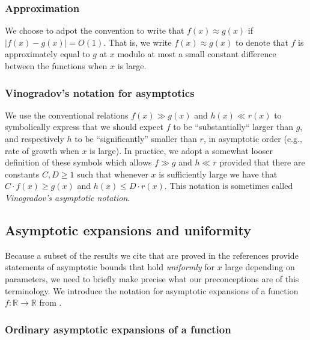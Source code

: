 \documentclass[11pt,reqno,a4letter]{article}
\numberwithin{figure}{section}
\numberwithin{table}{section}
\theoremstyle{plain}
\numberwithin{theorem}{section}
\theoremstyle{definition}
\begin{document}
\subsubsection{Approximation} 
     
We choose to adpot the convention to write that $f(x) \approx g(x)$ if $|f(x) - g(x)| = O(1)$. 
That is, we write $f(x) \approx g(x)$ to denote that $f$ is approximately equal to $g$ at $x$ modulo at most a
small constant difference between the functions when $x$ is large. 

\subsubsection{Vinogradov's notation for asymptotics} 

We use the conventional relations $f(x) \gg g(x)$ and $h(x) \ll r(x)$ to symbolically express that we should expect 
$f$ to be ``substantially`` larger than $g$, and respectively $h$ 
to be ``significantly'' smaller than $r$, in asymptotic order 
(e.g., rate of growth when $x$ is large). In practice, we adopt a somewhat looser definition of these symbols which 
allows $f \gg g$ and $h \ll r$ provided that there are constants $C, D \geq 1$ such that whenever $x$ is sufficiently 
large we have that $C \cdot f(x) \geq g(x)$ and $h(x) \leq D \cdot r(x)$. This notation is sometimes called 
\emph{Vinogradov's asymptotic notation}. 

\subsection{Asymptotic expansions and uniformity} 

Because a subset of the results we cite that are proved in the references 
provide statements of 
asymptotic bounds that hold \emph{uniformly} for $x$ large depending on parameters, 
we need to briefly make precise what our preconceptions are of this terminology. 
We introduce the notation for asymptotic expansions of a function $f: \mathbb{R} \rightarrow \mathbb{R}$ from 
\cite[\S 2.1(iii)]{NISTHB}. 

\subsubsection{Ordinary asymptotic expansions of a function} 
\end{document}
